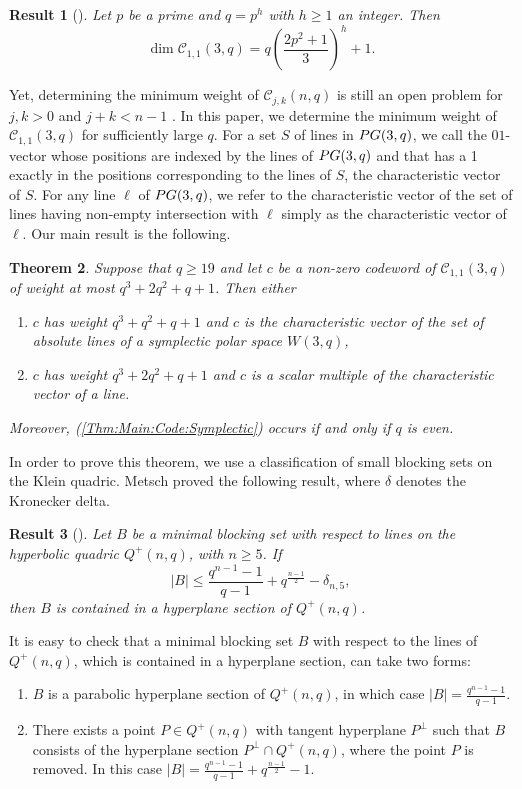 \documentclass[a4paper]{article}
\newtheorem{thm}{Theorem}[section]
\newtheorem{res}[thm]{Result}
\theoremstyle{definition}
\newcommand{\pg}{\textnormal{PG}}
\newcommand{\mc}{\mathcal C}
\begin{document}
\begin{res}[{\cite{Sin:04}}]
 \label{Res:DimCode}
 Let $p$ be a prime and $q = p^h$ with $h \geq 1$ an integer.
 Then
 \[
  \dim \mc_{1,1}(3,q) = q \left( \frac{2p^2+1}3 \right)^h + 1.
 \]
\end{res}

Yet, determining the minimum weight of $\mc_{j,k}(n,q)$ is still an open problem for $j,k>0$ and $j+k < n-1$ \cite[Open Problem 2.4]{LavrauwC}.
In this paper, we determine the minimum weight of $\mc_{1,1}(3,q)$ for sufficiently large $q$.
For a set $S$ of lines in $\pg(3,q)$, we call the $01$-vector whose positions are indexed by the lines of $\pg(3,q)$ and that has a 1 exactly in the positions corresponding to the lines of $S$, the characteristic vector of $S$.
For any line $\ell$ of $\pg(3,q)$, we refer to the characteristic vector of the set of lines having non-empty intersection with $\ell$ simply as the characteristic vector of $\ell$.
Our main result is the following.

\begin{thm}
 \label{Thm:Main:Code}
 Suppose that $q \geq 19$ and let $c$ be a non-zero codeword of $\mc_{1,1}(3,q)$ of weight at most $q^3+2q^2+q+1$.
 Then either
 \begin{enumerate}
  \item \label{Thm:Main:Code:Symplectic} $c$ has weight $q^3+q^2+q+1$ and $c$ is the characteristic vector of the set of absolute lines of a symplectic polar space $W(3,q)$,
  \item $c$ has weight $q^3+2q^2+q+1$ and $c$ is a scalar multiple of the characteristic vector of a line.
 \end{enumerate}
 Moreover, (\ref{Thm:Main:Code:Symplectic}) occurs if and only if $q$ is even.
\end{thm}

In order to prove this theorem, we use a classification of small blocking sets on the Klein quadric.
Metsch \cite{metsch2000blocking} proved the following result, where $\delta$ denotes the Kronecker delta.

\begin{res}[{\cite[Theorem 1.1]{metsch2000blocking}}]
 \label{Res:Metsch}
 Let $B$ be a minimal blocking set with respect to lines on the hyperbolic quadric $Q^+(n,q)$, with $n \geq 5$.
 If
 \[
  |B| \leq \frac{q^{n-1}-1}{q-1} + q^\frac{n-1}2 - \delta_{n,5},
 \]
 then $B$ is contained in a hyperplane section of $Q^+(n,q)$.
\end{res}

It is easy to check that a minimal blocking set $B$ with respect to the lines of $Q^+(n,q)$, which is contained in a hyperplane section, can take two forms:
 \begin{enumerate}
  \item $B$ is a parabolic hyperplane section of $Q^+(n,q)$, in which case $|B| = \frac{q^{n-1}-1}{q-1}$.
  \item There exists a point $P \in Q^+(n,q)$ with tangent hyperplane $P^\perp$ such that $B$ consists of the hyperplane section $P^\perp \cap Q^+(n,q)$, where the point $P$ is removed.
  In this case $|B| = \frac{q^{n-1}-1}{q-1} + q^\frac{n-1}2 - 1$.
 \end{enumerate}
\end{document}
